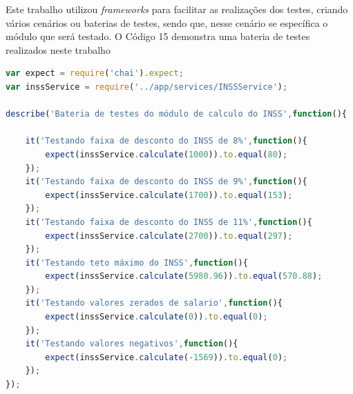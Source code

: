 \par Este trabalho utilizou \textit{frameworks} para facilitar as realizações dos testes, criando vários cenários ou baterias de testes, sendo que, nesse cenário se específica o módulo que será testado. O Código 15 demonstra uma bateria de testes realizados neste trabalho

\clearpage
\newpage

    

\begin{lstlisting}[language=JavaScript, caption={[Criação de todos os testes INSS.]{Criação de todos os testes INSS.  \textbf{Fonte:} Elaborado pelos autores.}}]
var expect = require('chai').expect;
var inssService = require('../app/services/INSSService');

describe('Bateria de testes do módulo de calculo do INSS',function(){
    
    it('Testando faixa de desconto do INSS de 8%',function(){
        expect(inssService.calculate(1000)).to.equal(80);
    });
    it('Testando faixa de desconto do INSS de 9%',function(){
        expect(inssService.calculate(1700)).to.equal(153);
    });
    it('Testando faixa de desconto do INSS de 11%',function(){
        expect(inssService.calculate(2700)).to.equal(297);
    });
    it('Testando teto máximo do INSS',function(){
        expect(inssService.calculate(5980.96)).to.equal(570.88);
    });
    it('Testando valores zerados de salario',function(){
        expect(inssService.calculate(0)).to.equal(0);
    });
    it('Testando valores negativos',function(){
        expect(inssService.calculate(-1569)).to.equal(0);
    });
});

\end{lstlisting}



